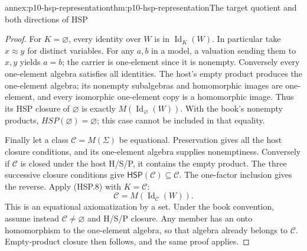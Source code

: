 \begin{annexitem}{annex:p10-hsp-representation}{thm:p10-hsp-representation}{The target quotient and both directions of HSP}
\begin{proof}
For \(K=\varnothing\), every identity over \(W\)
is in \(\operatorname{Id}_K(W)\). In particular
take \(x\approx y\) for distinct variables.
For any \(a,b\) in a model, a valuation sending
them to \(x,y\) yields \(a=b\); the carrier is
one-element since it is nonempty.
Conversely every one-element algebra satisfies
all identities. The host's empty product produces
the one-element algebra; its nonempty subalgebras
and homomorphic images are one-element, and every
isomorphic one-element copy is a homomorphic image.
Thus its HSP closure of \(\varnothing\) is
exactly \(M(\operatorname{Id}_\varnothing(W))\).
With the book's nonempty products,
\(HSP(\varnothing)=\varnothing\); this case cannot
be included in that equality.

Finally let a class \(\mathcal C=M(\Sigma)\)
be equational. Preservation gives all the
host closure conditions, and its one-element
algebra supplies nonemptiness.
Conversely if \(\mathcal C\) is closed under
the host H/S/P, it contains the empty product.
The three successive closure conditions give
\(\mathsf H\mathsf S\mathsf P(\mathcal C)\subseteq\mathcal C\).
The one-factor inclusion gives the reverse.
Apply (HSP.8) with \(K=\mathcal C\):
\[
 \mathcal C=M(\operatorname{Id}_{\mathcal C}(W)).
 \]
This is an equational axiomatization by a set.
Under the book convention, assume instead
\(\mathcal C\ne\varnothing\) and H/S/P closure.
Any member has an onto homomorphism to the
one-element algebra, so that algebra already
belongs to \(\mathcal C\). Empty-product closure
then follows, and the same proof applies.
\end{proof}
\end{annexitem}

